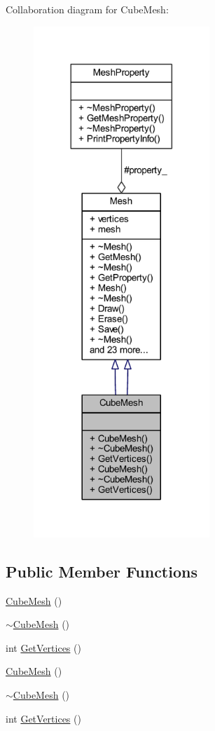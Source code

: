 Collaboration diagram for Cube\+Mesh\+:
\nopagebreak
\begin{figure}[H]
\begin{center}
\leavevmode
\includegraphics[width=188pt]{class_cube_mesh__coll__graph}
\end{center}
\end{figure}
\subsection*{Public Member Functions}
\begin{DoxyCompactItemize}
\item 
\mbox{\hyperlink{class_cube_mesh_aa096a7e837e8da5fb18b9e463ef9ea20}{Cube\+Mesh}} ()
\item 
\mbox{\hyperlink{class_cube_mesh_ab785a66ca3587acc32ff3c710dfeff47}{$\sim$\+Cube\+Mesh}} ()
\item 
int \mbox{\hyperlink{class_cube_mesh_af86c2c0b5d36a8579904cad368ae381a}{Get\+Vertices}} ()
\item 
\mbox{\hyperlink{class_cube_mesh_aa096a7e837e8da5fb18b9e463ef9ea20}{Cube\+Mesh}} ()
\item 
\mbox{\hyperlink{class_cube_mesh_ab785a66ca3587acc32ff3c710dfeff47}{$\sim$\+Cube\+Mesh}} ()
\item 
int \mbox{\hyperlink{class_cube_mesh_af86c2c0b5d36a8579904cad368ae381a}{Get\+Vertices}} ()
\end{DoxyCompactItemize}
